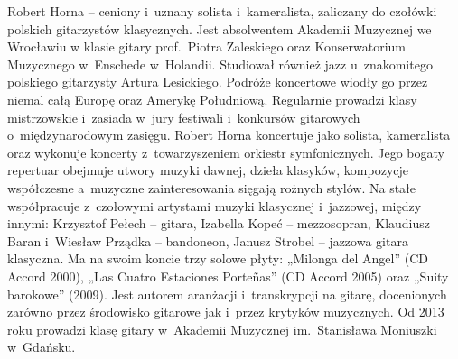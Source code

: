 \documentclass[twoside,a4page]{article}
\begin{document}
\fontsize{10pt}{14pt}\selectfont
Robert Horna – ceniony i~uznany solista i~kameralista, zaliczany do
czołówki polskich gitarzystów klasycznych. Jest absolwentem Akademii
Muzycznej we Wrocławiu w klasie gitary prof.~Piotra Zaleskiego oraz
Konserwatorium Muzycznego w~Enschede w~Holandii. Studiował również
jazz u~znakomitego polskiego gitarzysty Artura Lesickiego. Podróże
koncertowe wiodły go przez niemal całą Europę oraz Amerykę
Południową. Regularnie prowadzi klasy mistrzowskie i~zasiada w~jury
festiwali i~konkursów gitarowych o~międzynarodowym zasięgu. Robert
Horna koncertuje jako solista, kameralista oraz wykonuje koncerty
z~towarzyszeniem orkiestr symfonicznych. Jego bogaty repertuar obejmuje
utwory muzyki dawnej, dzieła klasyków, kompozycje współczesne
a~muzyczne zainteresowania sięgają rożnych stylów. Na stałe współpracuje
z~czołowymi artystami muzyki klasycznej i~jazzowej, między innymi:
Krzysztof Pełech – gitara, Izabella Kopeć – mezzosopran, Klaudiusz
Baran i~Wiesław Prządka – bandoneon, Janusz Strobel – jazzowa gitara
klasyczna. Ma na swoim koncie trzy solowe płyty: „Milonga del Angel”
(CD Accord 2000), „Las Cuatro Estaciones Porteñas” (CD Accord 2005)
oraz „Suity barokowe” (2009). Jest autorem aranżacji i~transkrypcji na
gitarę, docenionych zarówno przez środowisko gitarowe jak i~przez
krytyków muzycznych. Od 2013 roku prowadzi klasę gitary w~Akademii
Muzycznej im.~Stanisława Moniuszki w~Gdańsku.
\end{document}
